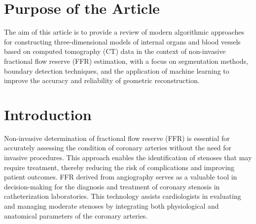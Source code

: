 \documentclass[default]{subfiles}
\begin{document}




\maketitle

\section{Purpose of the Article}

The aim of this article is to provide a review of modern algorithmic approaches for constructing three-dimensional
models of internal organs and blood vessels based on computed tomography (CT) data in the context of non-invasive
fractional flow reserve (FFR) estimation, with a focus on segmentation methods, boundary detection techniques, and the
application of machine learning to improve the accuracy and reliability of geometric reconstruction.

\section{Introduction}

\label{sec:intro}

Non-invasive determination of fractional flow reserve (FFR) is essential for accurately assessing the condition of
coronary arteries without the need for invasive procedures. This approach enables the identification of stenoses that
may require treatment, thereby reducing the risk of complications and improving patient outcomes. FFR derived from
angiography serves as a valuable tool in decision-making for the diagnosis and treatment of coronary stenosis in
catheterization laboratories. This technology assists cardiologists in evaluating and managing moderate stenoses by
integrating both physiological and anatomical parameters of the coronary arteries.
\end{document}
